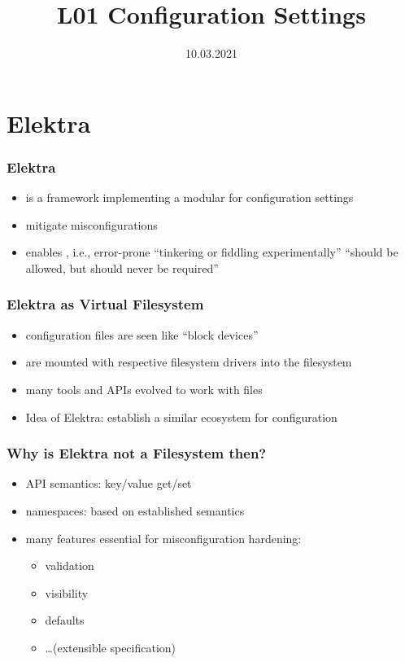 

\title{L01 Configuration Settings}
\date{10.03.2021}


\section{Elektra}
\begin{frame}
	\frametitle{Elektra~\cite{raab2016elektra}}
	\begin{itemize}[<+->]
		\item \elektra{} is a framework implementing a modular  for configuration settings
		\item {} mitigate misconfigurations
		\item \elektra{} enables  \cite{holland2001nofutz},
			i.e., error-prone \enquote{tinkering or fiddling experimentally} \enquote{should be allowed, but should never be required}
	\end{itemize}
\end{frame}

\begin{frame}
	\frametitle{Elektra as Virtual Filesystem}
	\begin{itemize}
	\item configuration files are seen like ``block devices''
	\item are mounted with respective filesystem drivers into the filesystem
	\item many tools and APIs evolved to work with files
	\item Idea of Elektra: establish a similar ecosystem for configuration
	\end{itemize}
\end{frame}

\begin{frame}
	\frametitle{Why is Elektra not a Filesystem then?}
	\begin{itemize}
	\item API semantics: key/value get/set
	\item namespaces: based on established semantics
	\item many features essential for misconfiguration hardening:
		\begin{itemize}
		\item validation
		\item visibility
		\item defaults
		\item \dots (extensible specification)
		\end{itemize}
	\end{itemize}
\end{frame}


